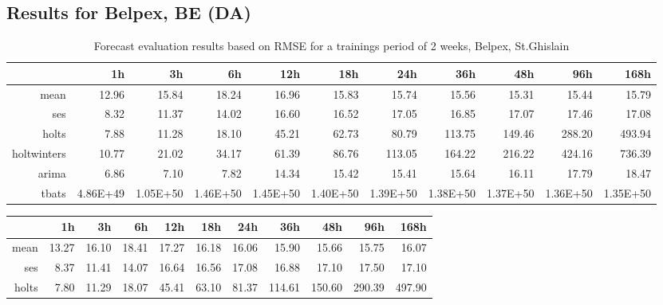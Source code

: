 \begin{landscape}

\subsection{Results for Belpex, BE (DA)} \label{ssec:app_tables_belpex}



\begin{table}[ht]
\centering
\vspace*{-0.2in}
\begin{tabular}{rrrrrrrrrrr}
  \hline
 & 1h & 3h & 6h & 12h & 18h & 24h & 36h & 48h & 96h & 168h \\ 
  \hline
mean & 12.96 & 15.84 & 18.24 & 16.96 & 15.83 & 15.74 & 15.56 & 15.31 & 15.44 & 15.79 \\ 
  ses & 8.32 & 11.37 & 14.02 & 16.60 & 16.52 & 17.05 & 16.85 & 17.07 & 17.46 & 17.08 \\ 
  holts & 7.88 & 11.28 & 18.10 & 45.21 & 62.73 & 80.79 & 113.75 & 149.46 & 288.20 & 493.94 \\ 
  holtwinters & 10.77 & 21.02 & 34.17 & 61.39 & 86.76 & 113.05 & 164.22 & 216.22 & 424.16 & 736.39 \\ 
  arima & 6.86 & 7.10 & 7.82 & 14.34 & 15.42 & 15.41 & 15.64 & 16.11 & 17.79 & 18.47 \\ 
  tbats & 4.86E+49 & 1.05E+50 & 1.46E+50 & 1.45E+50 & 1.40E+50 & 1.39E+50 & 1.38E+50 & 1.37E+50 & 1.36E+50 & 1.35E+50 \\ 
   \hline
\end{tabular}
\caption{Forecast evaluation results based on RMSE for a trainings period of 2 weeks, Belpex, St.Ghislain}
\label{tab:app_results_stghislain_2weeks}
\end{table}
\begin{table}[ht]
\centering
\vspace*{-0.1in}
\begin{tabular}{rrrrrrrrrrr}
  \hline
 & 1h & 3h & 6h & 12h & 18h & 24h & 36h & 48h & 96h & 168h \\ 
  \hline
mean & 13.27 & 16.10 & 18.41 & 17.27 & 16.18 & 16.06 & 15.90 & 15.66 & 15.75 & 16.07 \\ 
  ses & 8.37 & 11.41 & 14.07 & 16.64 & 16.56 & 17.08 & 16.88 & 17.10 & 17.50 & 17.10 \\ 
  holts & 7.80 & 11.29 & 18.07 & 45.41 & 63.10 & 81.37 & 114.61 & 150.60 & 290.39 & 497.90 \\ 

\end{tabular}
\end{table}
\end{landscape}
